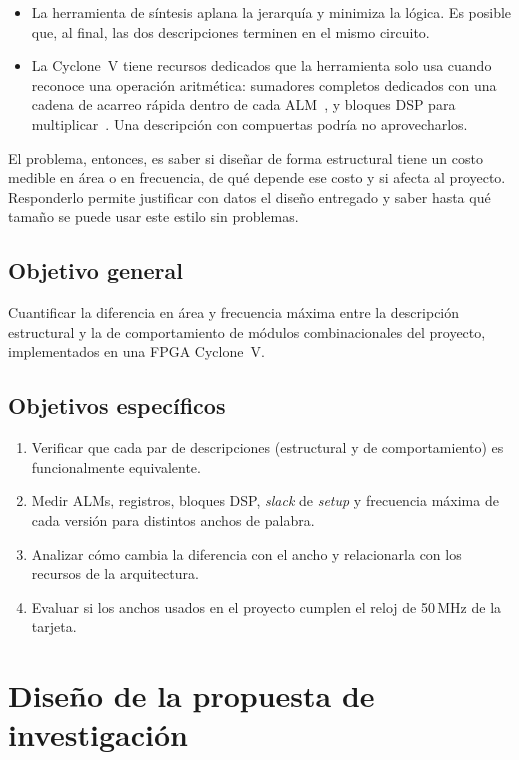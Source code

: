 \documentclass[11pt,letterpaper]{article}
\begin{document}
\begin{itemize}
    \item La herramienta de síntesis aplana la jerarquía y minimiza la lógica. Es posible que, al
    final, las dos descripciones terminen en el mismo circuito.
    \item La Cyclone~V tiene recursos dedicados que la herramienta solo usa cuando reconoce una
    operación aritmética: sumadores completos dedicados con una cadena de acarreo rápida dentro de
    cada ALM~\cite{cv_arith}, y bloques DSP para multiplicar~\cite{quartus_mult}. Una descripción
    con compuertas podría no aprovecharlos.
\end{itemize}

El problema, entonces, es saber si diseñar de forma estructural tiene un costo medible en área o
en frecuencia, de qué depende ese costo y si afecta al proyecto. Responderlo permite justificar
con datos el diseño entregado y saber hasta qué tamaño se puede usar este estilo sin problemas.

\subsection*{Objetivo general}
Cuantificar la diferencia en área y frecuencia máxima entre la descripción estructural y la de
comportamiento de módulos combinacionales del proyecto, implementados en una FPGA Cyclone~V.

\subsection*{Objetivos específicos}
\begin{enumerate}
    \item Verificar que cada par de descripciones (estructural y de comportamiento) es funcionalmente
    equivalente.
    \item Medir ALMs, registros, bloques DSP, \emph{slack} de \emph{setup} y frecuencia máxima de
    cada versión para distintos anchos de palabra.
    \item Analizar cómo cambia la diferencia con el ancho y relacionarla con los recursos de la
    arquitectura.
    \item Evaluar si los anchos usados en el proyecto cumplen el reloj de 50\,MHz de la tarjeta.
\end{enumerate}

\section{Diseño de la propuesta de investigación}
\end{document}
